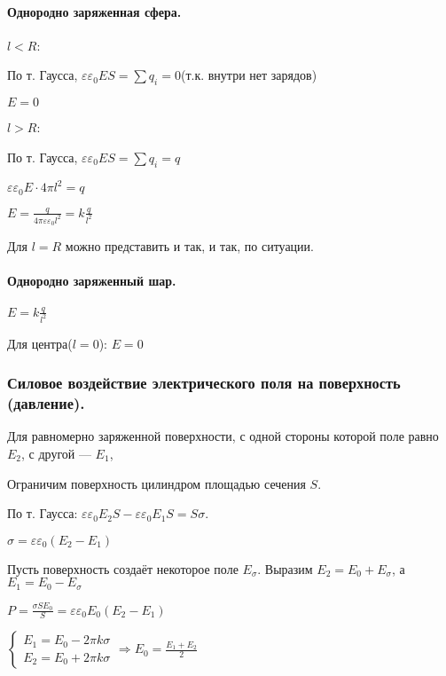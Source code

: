 \documentclass{article}
\begin{document}
            \paragraph{Однородно заряженная сфера.}
                \(l < R\): 
                
                По т. Гаусса, \(\varepsilon \varepsilon_0 E S = \sum{q_i} = 0\)(т.к. внутри нет зарядов)

                \(E = 0\)

                \(l > R\): 
                
                По т. Гаусса, \(\varepsilon \varepsilon_0 E S = \sum{q_i} = q\)
                
                \(\varepsilon \varepsilon_0 E \cdot 4\pi l^2 = q\)

                \(E = \frac{q}{4\pi \varepsilon \varepsilon_0 l^2} = k\frac{q}{l^2}\)

                Для \(l = R\) можно представить и так, и так, по ситуации.
            \paragraph{Однородно заряженный шар.}
                \(E = k\frac{q}{l^2}\)

                Для центра(\(l = 0\)): \(E = 0\)
        \subsubsection{Силовое воздействие электрического поля на поверхность (давление).}
                Для равномерно заряженной поверхности, с одной стороны которой поле равно \(E_2\), с другой --- \(E_1\), 
                
                Ограничим поверхность цилиндром площадью сечения \(S\).

                По т. Гаусса: \(\varepsilon\varepsilon_0 E_2 S - \varepsilon\varepsilon_0 E_1 S = S\sigma\).
                
                \(\sigma = \varepsilon\varepsilon_0(E_2 - E_1)\)

                Пусть поверхность создаёт некоторое поле \(E_\sigma\). Выразим \(E_2 = E_0 + E_\sigma\), а \(E_1 = E_0 - E_\sigma\)

                \(P = \frac{\sigma S E_0}{S} = \varepsilon\varepsilon_0 E_0(E_2 - E_1)\)

                \(\begin{cases}
                        E_1 = E_0 - 2\pi k \sigma\\
                        E_2 = E_0 + 2\pi k \sigma
                    \end{cases} \Rightarrow E_0 = \frac{E_1+E_2}{2}\)
\end{document}
